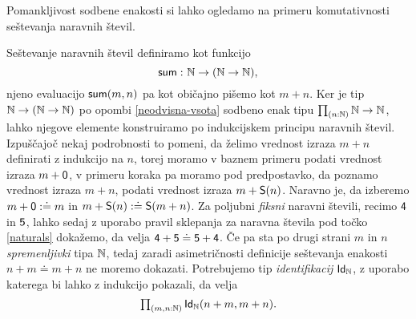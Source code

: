 Pomankljivost sodbene enakosti si lahko ogledamo na primeru komutativnosti seštevanja naravnih števil.

\begin{primer}
  Seštevanje naravnih števil definiramo kot funkcijo
  \[\textnormal{\textsf{sum}} \,\colon \mathbb N \to (\mathbb N \to \mathbb N),\] njeno evaluacijo \(\textnormal{\textsf{sum}}(m, n)\)
  pa kot običajno pišemo kot \(m + n\).
  Ker je tip \(\mathbb N \to (\mathbb N \to \mathbb N)\) po opombi \ref{neodvisna-vsota} sodbeno enak tipu
  \(\textstyle \prod_{\left( n : \mathbb N \right)} \mathbb N \to \mathbb N\), lahko njegove elemente konstruiramo po indukcijskem
  principu naravnih števil.
  Izpuščajoč nekaj podrobnosti to pomeni, da želimo vrednost izraza \(m + n\) definirati z
  indukcijo na \(n\), torej moramo v baznem primeru podati vrednost izraza \(m + \textnormal{\textsf{0}}\),
  v primeru koraka pa moramo pod predpostavko, da poznamo vrednost izraza \(m + n\),
  podati vrednost izraza \(m + \textnormal{\textsf{S}}(n)\). Naravno je,
  da izberemo \(m + \textnormal{\textsf{0}} :\doteq m\) in \(m + \textnormal{\textsf{S}}(n) :\doteq\textnormal{\textsf{S}}(m + n)\).
  Za poljubni \emph{fiksni} naravni števili, recimo
  \(\textnormal{\textsf{4}}\) in \(\textnormal{\textsf{5}}\), lahko sedaj z uporabo pravil sklepanja za naravna
  števila pod točko \ref{naturals} dokažemo, da velja
  \(\textnormal{\textsf{4}} + \textnormal{\textsf{5}} \doteq \textnormal{\textsf{5}} + \textnormal{\textsf{4}}\). Če pa sta po drugi strani
  \(m\) in \(n\)
  \emph{spremenljivki} tipa \(\mathbb N\), tedaj zaradi asimetričnosti definicije seštevanja
  enakosti \(n + m \doteq m + n\) ne moremo
  dokazati. Potrebujemo tip \emph{identifikacij} \(\textnormal{\textsf{Id}}_{\mathbb N}\), z uporabo katerega bi
  lahko z indukcijo pokazali, da velja \[\textstyle \prod_{\left( m, n : \mathbb N \right)} \textnormal{\textsf{Id}}_{\mathbb N}(n + m, m + n).\]
\end{primer}

